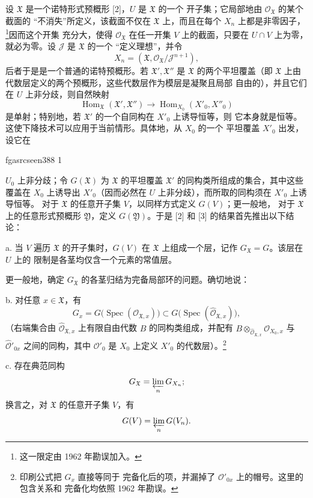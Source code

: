 \documentclass[12pt,twoside,openany]{book}
\numberwithin{equation}{section}
\newcommand{\fgaunitid}{unbound}
\newcommand{\src}[1]{%
  \phantomsection
  \hypertarget{src:\fgaunitid:#1}{}%
  \hypertarget{fga.\fgaunitid.p#1}{}%
  \ifcsname fgasrcseen#1\endcsname\else
    \expandafter\gdef\csname fgasrcseen#1\endcsname{1}%
    \hypertarget{src:#1}{}%
  \fi
  \marginpar{\raggedleft\footnotesize\sffamily #1}%
}
\newcommand{\fquote}[1]{“#1”}
\theoremstyle{plain}
\theoremstyle{definition}
\theoremstyle{remark}
\begin{document}
设 $\mathfrak X$ 是一个诺特形式预概形 [2]，$U$ 是 $\mathfrak X$ 的一个
开子集；它局部地由 $\mathcal O_{\mathfrak X}$ 的某个截面的
\fquote{不消失}所定义，该截面不仅在 $\mathfrak X$ 上，而且在每个
$X_n$ 上都是非零因子，\footnote{这一限定由 1962 年勘误加入。}因而这个开集
充分大，使得 $\mathcal O_{\mathfrak X}$ 在任一开集 $V$ 上的截面，只要在
$U\cap V$ 上为零，就必为零。设 $\mathcal J$ 是 $\mathfrak X$ 的一个
\fquote{定义理想}，并令
\[
  X_n=(\mathfrak X,\mathcal O_{\mathfrak X}/\mathcal J^{n+1}),
\]
后者于是是一个普通的诺特预概形。若
$\mathfrak X',\mathfrak X''$ 是 $\mathfrak X$ 的两个平坦覆盖（即
$\mathfrak X$ 上由代数层定义的两个预概形，这些代数层作为模层是凝聚且局部
自由的），并且它们在 $U$ 上非分歧，则自然映射
\[
  \operatorname{Hom}_{\mathfrak X}(\mathfrak X',\mathfrak X'')
  \longrightarrow
  \operatorname{Hom}_{X_0}(X'_0,X''_0)
\]
是单射；特别地，若 $\mathfrak X'$ 的一个自同构在 $X'_0$ 上诱导恒等，则
它本身就是恒等。这使下降技术可以应用于当前情形。具体地，从 $X_0$ 的一个
平坦覆盖 $X'_0$ 出发，设它在

\src{388}
$U_0$ 上非分歧；令 $G(\mathfrak X)$ 为 $\mathfrak X$ 的平坦覆盖
$\mathfrak X'$ 的同构类所组成的集合，其中这些覆盖在 $X_0$ 上诱导出
$X'_0$（因而必然在 $U$ 上非分歧），而所取的同构须在 $X'_0$ 上诱导恒等。
对于 $\mathfrak X$ 的任意开子集 $V$，以同样方式定义 $G(V)$；更一般地，
对于 $\mathfrak X$ 上的任意形式预概形 $\mathfrak Y$，定义
$G(\mathfrak Y)$。于是 [2] 和 [3] 的结果首先推出以下结论：

\noindent a. 当 $V$ 遍历 $\mathfrak X$ 的开子集时，$G(V)$ 在
$\mathfrak X$ 上组成一个层，记作 $G_{\mathfrak X}=G$。该层在 $U$ 上的
限制是各茎均仅含一个元素的常值层。

更一般地，确定 $G_{\mathfrak X}$ 的各茎归结为完备局部环的问题。确切地说：

\noindent b. 对任意 $x\in\mathfrak X$，有
\[
  G_x=G\bigl(\operatorname{Spec}(\mathcal O_{\mathfrak X,x})\bigr)
  \subset
  G\bigl(\operatorname{Spec}(\widehat{\mathcal O}_{\mathfrak X,x})\bigr),
\]
（右端集合由 $\widehat{\mathcal O}_{\mathfrak X,x}$ 上有限自由代数 $B$
的同构类组成，并配有
$B\otimes_{\widehat{\mathcal O}_{\mathfrak X,x}}\mathcal O_{X_0,x}$
与 $\widehat{\mathcal O}'_{0x}$ 之间的同构，其中 $\mathcal O'_0$ 是
$X_0$ 上定义 $X'_0$ 的代数层）。\footnote{印刷公式把 $G_x$ 直接等同于
完备化后的项，并漏掉了 $\mathcal O'_{0x}$ 上的帽号。这里的包含关系和
完备化均依照 1962 年勘误。}

\noindent c. 存在典范同构
\[
  G_{\mathfrak X}=\varprojlim_nG_{X_n} ;
\]
换言之，对 $\mathfrak X$ 的任意开子集 $V$，有
\[
  G(V)=\varprojlim_nG(V_n).
\]
\end{document}
